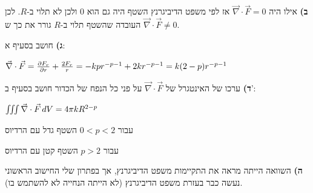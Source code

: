 \documentclass[14pt]{extarticle}
\makeatletter
\newenvironment{lefteqs}{%
    \begin{english}%
    \begin{flushleft}%
    \renewcommand{\arraystretch}{1.3}%
    $\begin{array}{@{}l@{}}%
}{%
    \end{array}$%
    \end{flushleft}%
    \end{english}%
}
\makeatother
\begin{document}
\textbf{ב)}
אילו היה $\vec{\nabla} \cdot \vec{F} = 0$ אז לפי משפט הדיביגרנץ השטף היה גם הוא 0 ולכן לא תלוי ב-$R$. לכן העובדה שהשטף תלוי ב-$R$ גורר את כך ש $\vec{\nabla} \cdot \vec{F} \neq 0$.

\textbf{ג)}
חושב בסעיף א:

\begin{lefteqs}
    \vec{\nabla} \cdot \vec{F} = \frac{\partial F_r}{\partial r} + \frac{2F_r}{r} = -kp r^{-p-1} + 2kr^{-p-1} = k(2-p)r^{-p-1}
\end{lefteqs}

\textbf{ד)}
ערכו של האינטגרל של $\vec{\nabla} \cdot \vec{F}$ על פני כל הנפח של הכדור חושב בסעיף ב':
\begin{lefteqs}
    \iiint \vec{\nabla} \cdot \vec{F} \, dV = 4\pi k R^{2-p}
\end{lefteqs}

עבור $0<p<2$ השטף גדל עם הרדיוס

עבור $p>2$ השטף קטן עם הרדיוס

\textbf{ה)}
השוואה הייתה מראה את התקיימות משפט הדיביגרנץ, אך בפתרון שלי החישוב הראשוני נעשה כבר בעזרת משפט הדיביגרנץ (לא הייתה הנחייה לא להשתמש בו).
\end{document}
